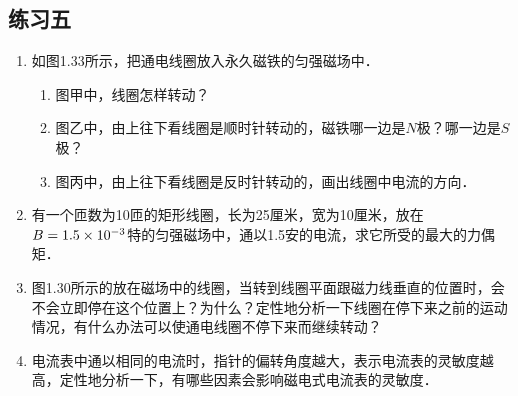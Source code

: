 \subsection{练习五}
\begin{enumerate}
    \item 如图1.33所示，把通电线圈放入永久磁铁的匀强磁场中．
    \begin{figure}[htp]\centering
    	\caption{ }
    \end{figure}
    \begin{enumerate}
        \item 图甲中，线圈怎样转动？
        \item 图乙中，由上往下看线圈是顺时针转动的，磁铁哪一边是$N$极？哪一边是$S$极？
        \item 图丙中，由上往下看线圈是反时针转动的，画出线圈中电流的方向．
    \end{enumerate}


    \begin{solution}
    
    \end{solution}
    
    \item 有一个匝数为10匝的矩形线圈，长为25厘米，宽为10厘米，放在$B=1.5\times10^{-3}$特的匀强磁场中，通以1.5安的电流，求它所受的最大的力偶矩．


    \begin{solution}
    
    \end{solution}
    
    \item 图1.30所示的放在磁场中的线圈，当转到线圈平面跟磁力线垂直的位置时，会不会立即停在这个位置上？为什么？定性地分析一下线圈在停下来之前的运动情况，有什么办法可以使通电线圈不停下来而继续转动？


    \begin{solution}
    
    \end{solution}
    
    \item 电流表中通以相同的电流时，指针的偏转角度越大，表示电流表的灵敏度越高，定性地分析一下，有哪些因素会影响磁电式电流表的灵敏度．


    \begin{solution}
    
    \end{solution}
    
\end{enumerate}


